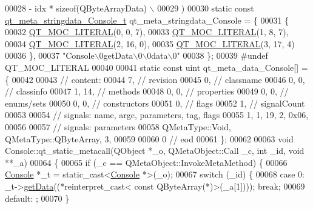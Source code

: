 \begin{DoxyCode}
00028 \textcolor{preprocessor}{        - idx * sizeof(QByteArrayData) \(\backslash\)}
00029 \textcolor{preprocessor}{    )}
00030 \textcolor{keyword}{static} \textcolor{keyword}{const} \hyperlink{a00013_dc/d54/a00094}{qt\_meta\_stringdata\_Console\_t} qt\_meta\_stringdata\_Console = \{
00031     \{
00032 \hyperlink{a00013_a75bb9482d242cde0a06c9dbdc6b83abe}{QT\_MOC\_LITERAL}(0, 0, 7),
00033 \hyperlink{a00013_a75bb9482d242cde0a06c9dbdc6b83abe}{QT\_MOC\_LITERAL}(1, 8, 7),
00034 \hyperlink{a00013_a75bb9482d242cde0a06c9dbdc6b83abe}{QT\_MOC\_LITERAL}(2, 16, 0),
00035 \hyperlink{a00013_a75bb9482d242cde0a06c9dbdc6b83abe}{QT\_MOC\_LITERAL}(3, 17, 4)
00036     \},
00037     \textcolor{stringliteral}{"Console\(\backslash\)0getData\(\backslash\)0\(\backslash\)0data\(\backslash\)0"}
00038 \};
00039 \textcolor{preprocessor}{#undef QT\_MOC\_LITERAL}
00040 
00041 \textcolor{keyword}{static} \textcolor{keyword}{const} uint qt\_meta\_data\_Console[] = \{
00042 
00043  \textcolor{comment}{// content:}
00044        7,       \textcolor{comment}{// revision}
00045        0,       \textcolor{comment}{// classname}
00046        0,    0, \textcolor{comment}{// classinfo}
00047        1,   14, \textcolor{comment}{// methods}
00048        0,    0, \textcolor{comment}{// properties}
00049        0,    0, \textcolor{comment}{// enums/sets}
00050        0,    0, \textcolor{comment}{// constructors}
00051        0,       \textcolor{comment}{// flags}
00052        1,       \textcolor{comment}{// signalCount}
00053 
00054  \textcolor{comment}{// signals: name, argc, parameters, tag, flags}
00055        1,    1,   19,    2, 0x06,
00056 
00057  \textcolor{comment}{// signals: parameters}
00058     QMetaType::Void, QMetaType::QByteArray,    3,
00059 
00060        0        \textcolor{comment}{// eod}
00061 \};
00062 
00063 \textcolor{keywordtype}{void} Console::qt\_static\_metacall(QObject *\_o, QMetaObject::Call \_c, \textcolor{keywordtype}{int} \_id, \textcolor{keywordtype}{void} **\_a)
00064 \{
00065     \textcolor{keywordflow}{if} (\_c == QMetaObject::InvokeMetaMethod) \{
00066         \hyperlink{a00002}{Console} *\_t = \textcolor{keyword}{static\_cast<}\hyperlink{a00002}{Console} *\textcolor{keyword}{>}(\_o);
00067         \textcolor{keywordflow}{switch} (\_id) \{
00068         \textcolor{keywordflow}{case} 0: \_t->\hyperlink{a00002_a1976aad46ce1a77be730bc628275038f}{getData}((*\textcolor{keyword}{reinterpret\_cast<} \textcolor{keyword}{const }QByteArray(*)\textcolor{keyword}{>}(\_a[1]))); \textcolor{keywordflow}{break};
00069         \textcolor{keywordflow}{default}: ;
00070         \}

\end{DoxyCode}
